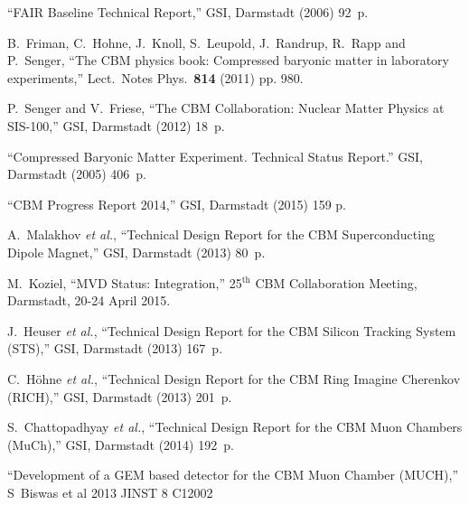 \begin{thebibliography}{99}


``FAIR Baseline Technical Report,'' GSI, Darmstadt (2006) 92~p. \\


B.~Friman, C.~Hohne, J.~Knoll, S.~Leupold, J.~Randrup, R.~Rapp and P.~Senger, ``The CBM physics book: Compressed baryonic matter in laboratory experiments,''
Lect.\ Notes Phys.\ {\bf 814} (2011) pp. 980.

P.~Senger and V.~Friese, ``The CBM Collaboration: Nuclear Matter Physics at SIS-100,'' GSI, Darmstadt (2012) 18~p.

``Compressed Baryonic Matter Experiment. Technical Status Report.'' GSI, Darmstadt (2005) 406~p.

``CBM Progress Report 2014,'' GSI, Darmstadt (2015) 159 p.


A.~Malakhov {\it et al.}, ``Technical Design Report for the CBM Superconducting Dipole Magnet,'' GSI, Darmstadt (2013) 80~p.

M.~Koziel, ``MVD Status: Integration,'' 25$^\mathrm{th}$ CBM Collaboration Meeting, Darmstadt, 20-24 April 2015.\\ 

J.~Heuser {\it et al.}, ``Technical Design Report for the CBM Silicon Tracking System (STS),'' GSI, Darmstadt (2013) 167~p.

C.~H\"{o}hne {\it et al.}, ``Technical Design Report for the CBM Ring Imagine Cherenkov (RICH),'' GSI, Darmstadt (2013) 201~p.

S.~Chattopadhyay {\it et al.}, ``Technical Design Report for the CBM Muon Chambers (MuCh),'' GSI, Darmstadt (2014) 192~p.

``Development of a GEM based detector for the CBM Muon Chamber (MUCH),''
S~Biswas et al 2013 JINST 8 C12002


\end{thebibliography}
